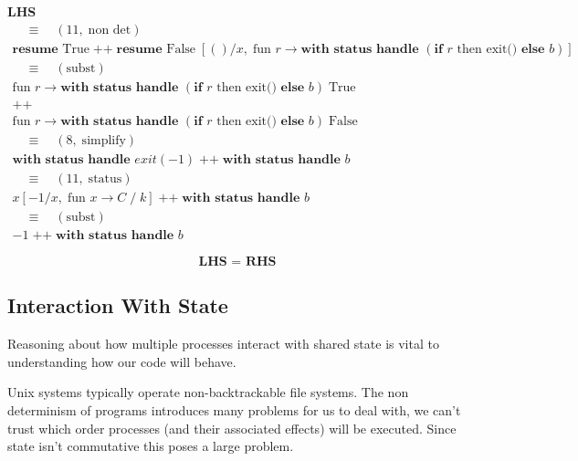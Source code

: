 \documentclass[logo,bsc,singlespacing,parskip]{infthesis}
\begin{document}
\textbf{LHS}
\[
\begin{array}{l}
\quad\equiv\quad (11,\; \text{non det}) \\[5pt]
\textbf{resume } \text{True} \;\texttt{++}\; \textbf{resume } \text{False} \; [()/x,\; \text{fun } r \rightarrow \textbf{with status handle } (\textbf{if } r \text{ then exit()} \textbf{ else } b)] \\[5pt]

\quad\equiv\quad (\text{subst}) \\[5pt]
\text{fun } r \rightarrow \textbf{with status handle } (\textbf{if } r \text{ then exit()} \textbf{ else } b)\; \text{True} \\
\texttt{++} \\
\text{fun } r \rightarrow \textbf{with status handle } (\textbf{if } r \text{ then} \text{ exit()} \textbf{ else } b)\; \text{False} \\[5pt]

\quad\equiv\quad (8,\; \text{simplify}) \\[5pt]
\textbf{with status handle } exit(-1) \;\texttt{++}\; \textbf{with status handle } b \\[5pt]

\quad\equiv\quad (11,\; \text{status}) \\[5pt]
x [-1/x,\; \text{fun } x \rightarrow C \;/\; k] \;\texttt{++}\; \textbf{with status handle } b \\[5pt]

\quad\equiv\quad (\text{subst}) \\[5pt]
-1 \;\texttt{++}\; \textbf{with status handle } b
\end{array}
\]


\[
\textbf{LHS = RHS}
\]

\subsection*{Interaction With State}
Reasoning about how multiple processes interact with shared state is vital to understanding how our code will behave. 

Unix systems typically operate non-backtrackable file systems. The non determinism of programs introduces many problems for us to deal with, we can't trust which order processes (and their associated effects) will be executed. Since state isn't commutative this poses a large problem.
\end{document}
